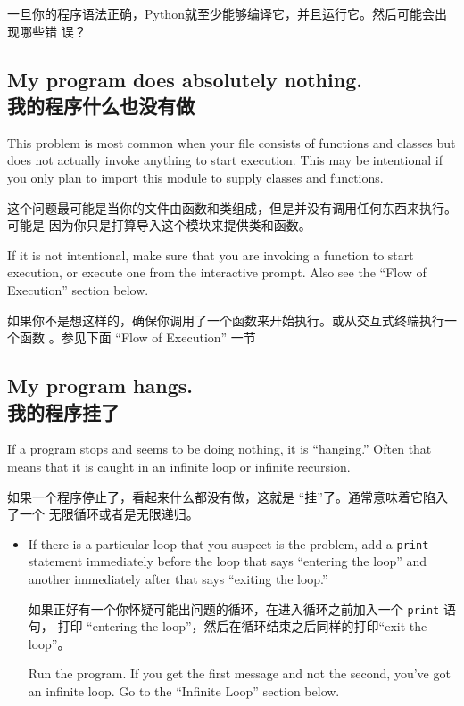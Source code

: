 \documentclass[10pt]{book}
\begin{document}
\begin{CJK}{UTF8}{gbsn}
一旦你的程序语法正确，Python就至少能够编译它，并且运行它。然后可能会出现哪些错
误？

\subsection{My program does absolutely nothing.\\我的程序什么也没有做}

This problem is most common when your file consists of functions and
classes but does not actually invoke anything to start execution.
This may be intentional if you only plan to import this module to
supply classes and functions.

这个问题最可能是当你的文件由函数和类组成，但是并没有调用任何东西来执行。可能是
因为你只是打算导入这个模块来提供类和函数。

If it is not intentional, make sure that you
are invoking a function to start execution, or execute one from
the interactive prompt.  Also see the ``Flow of Execution'' section
below.

如果你不是想这样的，确保你调用了一个函数来开始执行。或从交互式终端执行一个函数
。参见下面 ``Flow of Execution'' 一节

\subsection{My program hangs. \\ 我的程序挂了}

If a program stops and seems to be doing nothing, it is ``hanging.''
Often that means that it is caught in an infinite loop or infinite
recursion.

如果一个程序停止了，看起来什么都没有做，这就是 ``挂''了。通常意味着它陷入了一个
无限循环或者是无限递归。

\begin{itemize}

\item If there is a particular loop that you suspect is the
problem, add a {\tt print} statement immediately before the loop that says
``entering the loop'' and another immediately after that says
``exiting the loop.''

如果正好有一个你怀疑可能出问题的循环，在进入循环之前加入一个 {\tt print} 语句，
打印 ``entering the loop''，然后在循环结束之后同样的打印``exit the loop''。

Run the program.  If you get the first message and not the second,
you've got an infinite loop.  Go to the ``Infinite Loop'' section
below.


\end{itemize}
\end{CJK}
\end{document}
